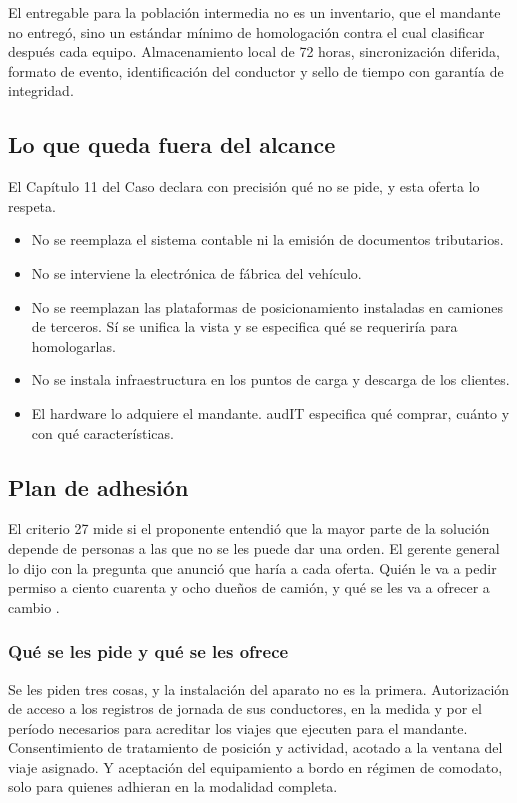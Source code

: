 El entregable para la población intermedia no es un inventario, que el mandante no entregó, sino un
estándar mínimo de homologación contra el cual clasificar después cada equipo. Almacenamiento local
de 72 horas, sincronización diferida, formato de evento, identificación del conductor y sello de
tiempo con garantía de integridad.

\subsection{Lo que queda fuera del alcance}

El Capítulo 11 del Caso declara con precisión qué no se pide, y esta oferta lo respeta.

\begin{itemize}
    \item No se reemplaza el sistema contable ni la emisión de documentos tributarios.
    \item No se interviene la electrónica de fábrica del vehículo.
    \item No se reemplazan las plataformas de posicionamiento instaladas en camiones de terceros.
    Sí se unifica la vista y se especifica qué se requeriría para homologarlas.
    \item No se instala infraestructura en los puntos de carga y descarga de los clientes.
    \item El hardware lo adquiere el mandante. audIT especifica qué comprar, cuánto y con qué
    características.
\end{itemize}

\subsection{Plan de adhesión}

El criterio 27 mide si el proponente entendió que la mayor parte de la solución depende de personas
a las que no se les puede dar una orden. El gerente general lo dijo con la pregunta que anunció que
haría a cada oferta. Quién le va a pedir permiso a ciento cuarenta y ocho dueños de camión, y qué
se les va a ofrecer a cambio \parencite{bases_caso10_2026}.

\subsubsection{Qué se les pide y qué se les ofrece}

Se les piden tres cosas, y la instalación del aparato no es la primera. Autorización de acceso a
los registros de jornada de sus conductores, en la medida y por el período necesarios para
acreditar los viajes que ejecuten para el mandante. Consentimiento de tratamiento de posición y
actividad, acotado a la ventana del viaje asignado. Y aceptación del equipamiento a bordo en
régimen de comodato, solo para quienes adhieran en la modalidad completa.

